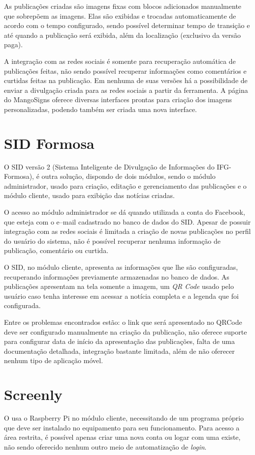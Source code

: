 As publicações criadas são imagens fixas com blocos adicionados manualmente que sobrepõem as imagens. Elas são exibidas e trocadas automaticamente de acordo com o tempo configurado, sendo possível determinar tempo de transição e até quando a publicação será exibida, além da localização (exclusivo da versão paga). 

A integração com as redes sociais é somente para recuperação automática de publicações feitas, não sendo possível recuperar informações como comentários e curtidas feitas na publicação. Em nenhuma de suas versões há a possibilidade de enviar a divulgação criada para as redes sociais a partir da ferramenta. A página do MangoSigns oferece diversas interfaces prontas para criação dos imagens personalizadas, podendo também ser criada uma nova interface. 

\section{SID Formosa}
\label{sec:sid}
O SID versão 2 (Sistema Inteligente de Divulgação de Informações do IFG-Formosa), é outra solução, dispondo de dois módulos, sendo o módulo administrador, usado para criação, editação e gerenciamento das publicações e o módulo cliente, usado para exibição das notícias criadas.

O acesso ao módulo administrador se dá quando utilizada a conta do Facebook, que esteja com o e--mail cadastrado no banco de dados do SID. Apesar de possuir integração com as redes sociais é limitada a criação de novas publicações no perfil do usuário do sistema, não é possível recuperar nenhuma informação de publicação, comentário ou curtida.

O SID, no módulo cliente, apresenta as informações que lhe são configuradas, recuperando informações previamente armazenadas no banco de dados. As publicações apresentam na tela somente a imagem, um \textit{QR Code} usado pelo usuário caso tenha interesse em acessar a notícia completa e a legenda que foi configurada. \citet{sobrinho2017}

Entre os problemas encontrados estão: o link que será apresentado no QRCode deve ser configurado manualmente na criação da publicação, não oferece suporte para configurar data de início da apresentação das publicações, falta de uma documentação detalhada, integração bastante limitada, além de não oferecer nenhum tipo de aplicação móvel.

\section{Screenly}
O \citet{screenly2017} usa o Raspberry Pi no módulo cliente, necessitando de um programa próprio que deve ser instalado no equipamento para seu funcionamento. Para acesso a área restrita, é possível apenas criar uma nova conta ou logar com uma existe, não sendo oferecido nenhum outro meio de automatização de \textit{login}. 

